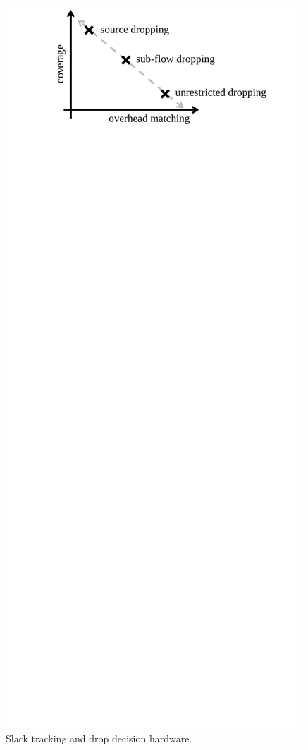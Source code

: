 \begin{figure}
\begin{center}
    \includegraphics[width=\columnwidth]{figs/policy_trade_off.pdf}
    \vspace{-0.3in}
    \caption{Slack tracking and drop decision hardware.}
    \label{fig:policies.trade_off}
    \vspace{-0.2in}
  \end{center}
\end{figure}

